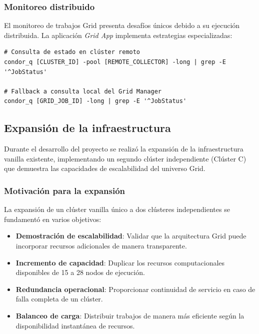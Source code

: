 \subsubsection{Monitoreo distribuido}
\noindent

El monitoreo de trabajos Grid presenta desafíos únicos debido a su ejecución distribuida. La aplicación \textit{Grid App} implementa estrategias especializadas:

\begin{verbatim}
# Consulta de estado en clúster remoto
condor_q [CLUSTER_ID] -pool [REMOTE_COLLECTOR] -long | grep -E '^JobStatus'

# Fallback a consulta local del Grid Manager
condor_q [GRID_JOB_ID] -long | grep -E '^JobStatus'
\end{verbatim}

\subsection{Expansión de la infraestructura}
\noindent

Durante el desarrollo del proyecto se realizó la expansión de la infraestructura vanilla existente, implementando un segundo clúster independiente (Clúster C) que demuestra las capacidades de escalabilidad del universo Grid.

\subsubsection{Motivación para la expansión}
\noindent

La expansión de un clúster vanilla único a dos clústeres independientes se fundamentó en varios objetivos:

\begin{itemize}
	\item \textbf{Demostración de escalabilidad}: Validar que la arquitectura Grid puede incorporar recursos adicionales de manera transparente.
	
	\item \textbf{Incremento de capacidad}: Duplicar los recursos computacionales disponibles de 15 a 28 nodos de ejecución.
	
	\item \textbf{Redundancia operacional}: Proporcionar continuidad de servicio en caso de falla completa de un clúster.
	
	\item \textbf{Balanceo de carga}: Distribuir trabajos de manera más eficiente según la disponibilidad instantánea de recursos.
\end{itemize}

